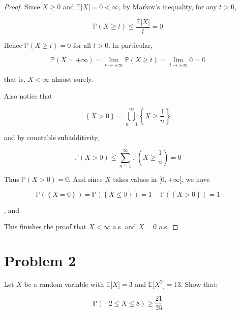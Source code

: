 \documentclass{qlnotes-export}
\begin{document}
\begin{proof}

Since \(X \geq 0\) and \({\mathbb{E}}\lbrack X\rbrack = 0 < \infty\), by Markov's inequality, for any \(t > 0\),

\[{\mathbb{P}}(X \geq t) \leq \frac{{\mathbb{E}}\lbrack X\rbrack}{t} = 0\]

Hence \({\mathbb{P}}(X \geq t) = 0\) for all \(t > 0\). In particular,

\[{\mathbb{P}}(X = + \infty) = \lim\limits_{t\rightarrow + \infty}{\mathbb{P}}(X \geq t) = \lim\limits_{t\rightarrow + \infty}0 = 0\]

that is, \(X < \infty\) almost surely.

Also notice that

\[\left\{ {X > 0} \right\} = \bigcup\limits_{n = 1}^{\infty}\left\{ {X \geq \frac{1}{n}} \right\}\]

and by countable subadditivity,

\[{\mathbb{P}}(X > 0) \leq \sum\limits_{n = 1}^{\infty}{\mathbb{P}}\left( {X \geq \frac{1}{n}} \right) = 0\]

Thus \({\mathbb{P}}(X > 0) = 0\). And since \(X\) takes values in \(\lbrack 0, + \infty\rbrack\), we have

\[{\mathbb{P}}(\left\{ {X = 0} \right\}) = {\mathbb{P}}(\left\{ {X \leq 0} \right\}) = 1 - {\mathbb{P}}(\left\{ {X > 0} \right\}) = 1\]

, and

This finishes the proof that \(X < \infty\) a.s. and \(X = 0\) a.s.

\end{proof}

\section{Problem 2}\label{problem-2-4}

Let \(X\) be a random variable with \({\mathbb{E}}\lbrack X\rbrack = 3\) and \({\mathbb{E}}\lbrack X^{2}\rbrack = 13\). Show that:

\[{\mathbb{P}}( - 2 \leq X \leq 8) \geq \frac{21}{25}\]
\end{document}
